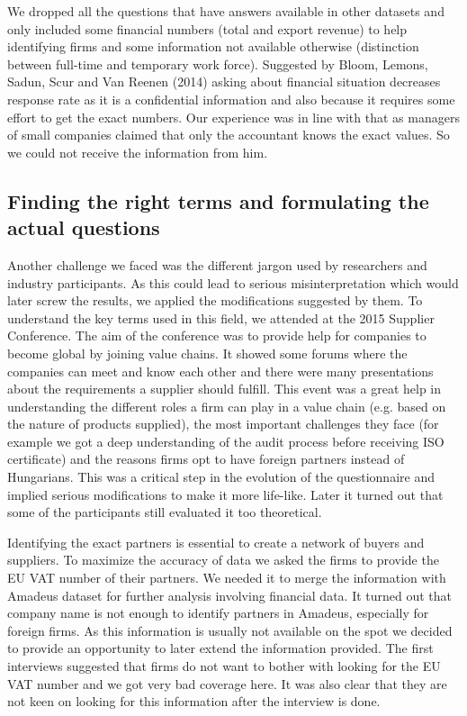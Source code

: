 \documentclass[final, dvipsnames, authoryear,12pt]{elsarticle}
\begin{document}
We dropped all the questions that have answers available in other datasets and only included some financial numbers (total and export revenue) to help identifying firms and some information not available otherwise (distinction between full-time and temporary work force). Suggested by Bloom, Lemons, Sadun, Scur and Van Reenen (2014) asking about financial situation decreases response rate as it is a confidential information and also because it requires some effort to get the exact numbers. Our experience was in line with that as managers of small companies claimed that only the accountant knows the exact values. So we could not receive the information from him.

\subsection{Finding the right terms and formulating the actual questions}

Another challenge we faced was the different jargon used by researchers and industry participants. As this could lead to serious misinterpretation which would later screw the results, we applied the modifications suggested by them. To understand the key terms used in this field, we attended at the 2015 Supplier Conference. The aim of the conference was to provide help for companies to become global by joining value chains. It showed some forums where the companies can meet and know each other and there were many presentations about the requirements a supplier should fulfill. This event was a great help in understanding the different roles a firm can play in a value chain (e.g. based on the nature of products supplied), the most important challenges they face (for example we got a deep understanding of the audit process before receiving ISO certificate) and the reasons firms opt to have foreign partners instead of Hungarians. This was a critical step in the evolution of the questionnaire and implied serious modifications to make it more life-like. Later it turned out that some of the participants still evaluated it too theoretical.

Identifying the exact partners is essential to create a network of buyers and suppliers. To maximize the accuracy of data we asked the firms to provide the EU VAT number of their partners. We needed it to merge the information with Amadeus dataset for further analysis involving financial data. It turned out that company name is not enough to identify partners in Amadeus, especially for foreign firms. As this information is usually not available on the spot we decided to provide an opportunity to later extend the information provided. The first interviews suggested that firms do not want to bother with looking for the EU VAT number and we got very bad coverage here. It was also clear that they are not keen on looking for this information after the interview is done.
\end{document}
